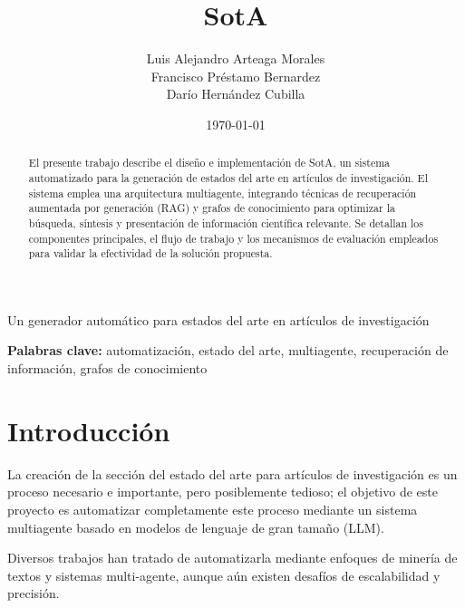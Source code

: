 \documentclass[12pt]{article}
\title{SotA}
\author{Luis Alejandro Arteaga Morales \\ Francisco Préstamo Bernardez \\ Darío Hernández Cubilla}
\date{\today}
\newcommand{\subtitle}{Un generador automático para estados del arte en artículos de investigación}
\begin{document}
\begin{center}
    {\LARGE \thetitle\par}
    \vspace{0.5em}
    {\large \subtitle\par}
    \vspace{1em}
    {\large \theauthor\par}
    \vspace{0.5em}
    {\normalsize \thedate\par}
\end{center}

\vspace{2em}

\begin{abstract}
    El presente trabajo describe el diseño e implementación de SotA, un sistema automatizado para la generación de estados del arte en artículos de investigación. El sistema emplea una arquitectura multiagente, integrando técnicas de recuperación aumentada por generación (RAG) y grafos de conocimiento para optimizar la búsqueda, síntesis y presentación de información científica relevante. Se detallan los componentes principales, el flujo de trabajo y los mecanismos de evaluación empleados para validar la efectividad de la solución propuesta.
    \end{abstract}
    
    \textbf{Palabras clave:} automatización, estado del arte, multiagente, recuperación de información, grafos de conocimiento
    
\newpage
\tableofcontents
\newpage


\section{Introducción}
La creación de la sección del estado del arte para artículos de investigación es un proceso necesario e importante, pero posiblemente tedioso; el objetivo de este proyecto es automatizar completamente este proceso mediante un sistema multiagente basado en modelos de lenguaje de gran tamaño (LLM)\cite{zhao2025surveylargelanguagemodels,haryanto2024llassistsimpletoolsautomating}.

Diversos trabajos han tratado de automatizarla mediante enfoques de minería de textos y sistemas multi-agente\cite{han2025llmmultiagentsystemschallenges}, aunque aún existen desafíos de escalabilidad y precisión.
\end{document}
